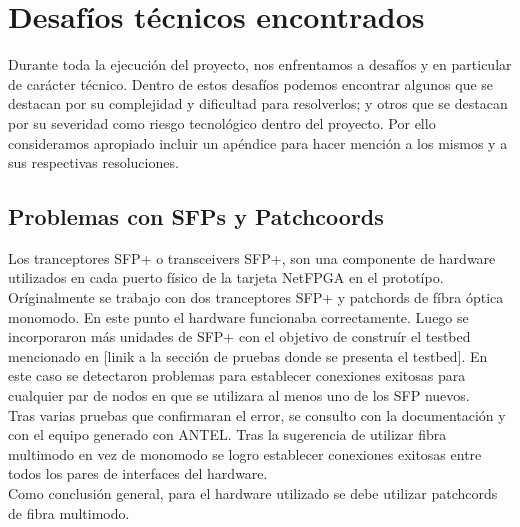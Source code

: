 
\chapter{Desaf\'ios t\'ecnicos encontrados}

\ifpdf
    \graphicspath{{Appendix2/Figs/Raster/}{Appendix2/Figs/PDF/}{Appendix2/Figs/}}
\else
    \graphicspath{{Appendix2/Figs/Vector/}{Appendix2/Figs/}}
\fi

Durante toda la ejecuci\'on del proyecto, nos enfrentamos a desaf\'ios y en particular de carácter t\'ecnico. Dentro de estos desaf\'ios podemos encontrar algunos que se destacan por su complejidad y dificultad para resolverlos; y otros que se destacan por su severidad como riesgo tecnol\'ogico dentro del proyecto. Por ello consideramos apropiado incluir un ap\'endice para hacer menci\'on a los mismos y a sus respectivas resoluciones.

\section{Problemas con SFPs y Patchcoords}

Los tranceptores SFP+ o transceivers SFP+, son una componente de hardware utilizados en cada puerto f\'isico de la tarjeta NetFPGA en el protot\'ipo.\\ 
 
Or\'iginalmente se trabajo con dos tranceptores SFP+ y patchords de f\'ibra \'optica monomodo. En este punto el hardware funcionaba correctamente. Luego se incorporaron m\'as unidades de SFP+ con el objetivo de constru\'ir el testbed mencionado en [linik a la secci\'on de pruebas donde se presenta el testbed]. En este caso se detectaron problemas para establecer conexiones exitosas para cualquier par de nodos en que se utilizara al menos uno de los SFP nuevos.\\

Tras varias pruebas que confirmaran el error, se consulto con la documentaci\'on y con el equipo generado con ANTEL. Tras la sugerencia de utilizar fibra multimodo en vez de monomodo se logro establecer conexiones exitosas entre todos los pares de interfaces del hardware.\\

Como conclusi\'on general, para el hardware utilizado se debe utilizar patchcords de fibra multimodo.

